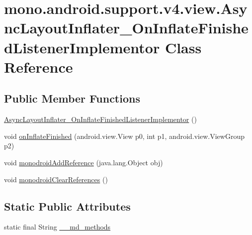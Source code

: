 \hypertarget{classmono_1_1android_1_1support_1_1v4_1_1view_1_1_async_layout_inflater___on_inflate_finished_listener_implementor}{
\section{mono.android.support.v4.view.AsyncLayoutInflater\_\-OnInflateFinishedListenerImplementor Class Reference}
\label{classmono_1_1android_1_1support_1_1v4_1_1view_1_1_async_layout_inflater___on_inflate_finished_listener_implementor}
}
\subsection*{Public Member Functions}
\begin{CompactItemize}
\item 
\hyperlink{classmono_1_1android_1_1support_1_1v4_1_1view_1_1_async_layout_inflater___on_inflate_finished_listener_implementor_f3041cf2ac12284569146082fdd3be63}{AsyncLayoutInflater\_\-OnInflateFinishedListenerImplementor} ()
\item 
void \hyperlink{classmono_1_1android_1_1support_1_1v4_1_1view_1_1_async_layout_inflater___on_inflate_finished_listener_implementor_f31cce908f0470666984ff2a3091b2df}{onInflateFinished} (android.view.View p0, int p1, android.view.ViewGroup p2)
\item 
void \hyperlink{classmono_1_1android_1_1support_1_1v4_1_1view_1_1_async_layout_inflater___on_inflate_finished_listener_implementor_eb414ca960fa961eda8878902552d73a}{monodroidAddReference} (java.lang.Object obj)
\item 
void \hyperlink{classmono_1_1android_1_1support_1_1v4_1_1view_1_1_async_layout_inflater___on_inflate_finished_listener_implementor_42cf4d28baf440ec1cc7f6c331c9c464}{monodroidClearReferences} ()
\end{CompactItemize}
\subsection*{Static Public Attributes}
\begin{CompactItemize}
\item 
static final String \hyperlink{classmono_1_1android_1_1support_1_1v4_1_1view_1_1_async_layout_inflater___on_inflate_finished_listener_implementor_2abef195e903df446ce88048c096ce16}{\_\-\_\-md\_\-methods}
\end{CompactItemize}
